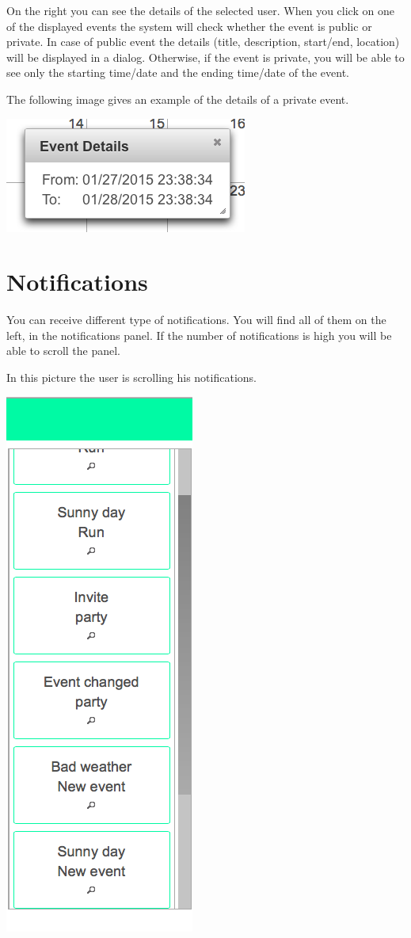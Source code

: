 \documentclass[10pt,a4paper,titlepage]{article}
\begin{document}
On the right you can see the details of the selected user.
When you click on one of the displayed events the system will check whether the event is public or private.
In case of public event the details (title, description, start/end, location) will be displayed in a dialog.
Otherwise, if the event is private, you will be able to see only the starting time/date and the ending time/date of the event. 

The following image gives an example of the details of a private event.

\begin{center}
\includegraphics[width=0.7\linewidth]{./images/23_event_details_private}
\end{center}

\section{Notifications}
You can receive different type of notifications. You will find all of them on the left, in the notifications panel. If the number of notifications is high you will be able to scroll the panel.

In this picture the user is scrolling his notifications.

\begin{center}
\includegraphics[width=0.3\linewidth]{./images/24_notification_scroll}
\end{center}
\end{document}
